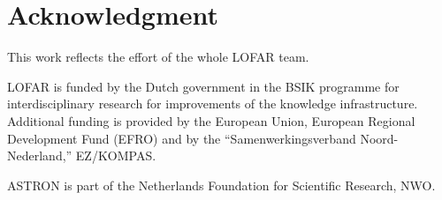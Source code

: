 \documentclass[journal]{IEEEtran}
\begin{document}
\section*{Acknowledgment}


This work reflects the effort of the whole LOFAR team.

LOFAR is funded by the Dutch government in the BSIK programme for
interdisciplinary research for improvements of the knowledge infrastructure.
Additional funding is provided by the European Union, European Regional
Development Fund (EFRO) and by the ``Samenwerkingsverband Noord-Nederland,''
EZ/KOMPAS.

ASTRON is part of the Netherlands Foundation for Scientific Research, NWO.

\ifCLASSOPTIONcaptionsoff
  \newpage
\fi





%
%
%
%
%



% 
\end{document}
